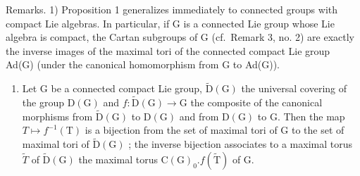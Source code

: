 Remarks. 1) Proposition 1 generalizes immediately to connected groups with compact Lie algebras. In particular, if G is a connected Lie group whose Lie algebra is compact, the Cartan subgroups of G (cf.~Remark 3, no. 2) are exactly the inverse images of the maximal tori of the connected compact Lie group Ad(G) (under the canonical homomorphism from G to Ad(G)).

\begin{enumerate}
\def\labelenumi{\arabic{enumi})}
\setcounter{enumi}{1}
\tightlist
\item
  Let G be a connected compact Lie group, \(\widetilde{\mathrm{D}}(\mathrm{G})\) the universal covering of the group \(\mathrm{D}(\mathrm{G})\) and \(f : \widetilde{\mathrm{D}}(\mathrm{G}) \to \mathrm{G}\) the composite of the canonical morphisms from \(\tilde{\mathrm{D}}(\mathrm{G})\) to \(\mathrm{D}(\mathrm{G})\) and from \(\mathrm{D}(\mathrm{G})\) to G. Then the map \(T \mapsto f^{-1}(\mathrm{T})\) is a bijection from the set of maximal tori of G to the set of maximal tori of \(\tilde{\mathrm{D}}(\mathrm{G})\) ; the inverse bijection associates to a maximal torus \(\tilde{T}\) of \(\tilde{\mathrm{D}}(\mathrm{G})\) the maximal torus \(\mathrm{C}(\mathrm{G})_{0}.f(\tilde{\mathrm{T}})\) of G.
\end{enumerate}

